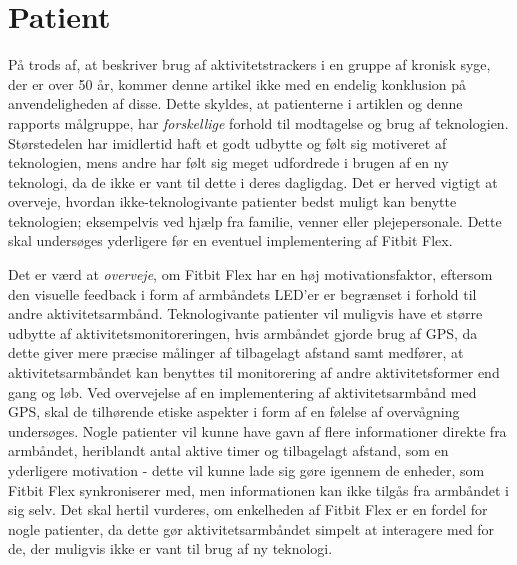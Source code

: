 \section{Patient} \label{sec:dis_patient}
På trods af, at \citeauthor{mercer2016} beskriver brug af aktivitetstrackers i en gruppe af kronisk syge, der er over 50 år, kommer denne artikel ikke med en endelig konklusion på anvendeligheden af disse. Dette skyldes, at patienterne i artiklen og denne rapports målgruppe, har \textit{forskellige} forhold til modtagelse og brug af teknologien. Størstedelen har imidlertid haft et godt udbytte og følt sig motiveret af teknologien, mens andre har følt sig meget udfordrede i brugen af en ny teknologi, da de ikke er vant til dette i deres dagligdag. Det er herved vigtigt at overveje, hvordan ikke-teknologivante patienter bedst muligt kan benytte teknologien; eksempelvis ved hjælp fra familie, venner eller plejepersonale. Dette skal undersøges yderligere før en eventuel implementering af Fitbit Flex. 

Det er værd at \textit{overveje}, om Fitbit Flex har en høj motivationsfaktor, eftersom den visuelle feedback i form af armbåndets LED'er er begrænset i forhold til andre aktivitetsarmbånd. 
Teknologivante patienter vil muligvis have et større udbytte af aktivitetsmonitoreringen, hvis armbåndet gjorde brug af GPS, da dette giver mere præcise målinger af tilbagelagt afstand samt medfører, at aktivitetsarmbåndet kan benyttes til monitorering af andre aktivitetsformer end gang og løb. Ved overvejelse af en implementering af aktivitetsarmbånd med GPS, skal de tilhørende etiske aspekter i form af en følelse af overvågning undersøges.
Nogle patienter vil kunne have gavn af flere informationer direkte fra armbåndet, heriblandt antal aktive timer og tilbagelagt afstand, som en yderligere motivation - dette vil kunne lade sig gøre igennem de enheder, som Fitbit Flex synkroniserer med, men informationen kan ikke tilgås fra armbåndet i sig selv. Det skal hertil vurderes, om enkelheden af Fitbit Flex er en fordel for nogle patienter, da dette gør aktivitetsarmbåndet simpelt at interagere med for de, der muligvis ikke er vant til brug af ny teknologi. 

